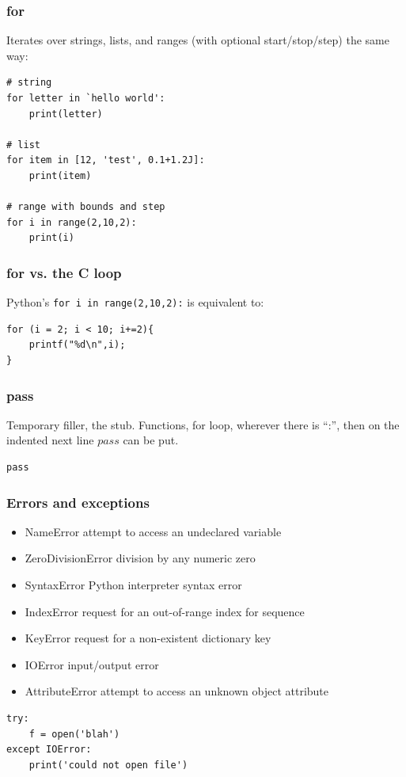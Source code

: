 \begin{frame}[fragile]\frametitle{for}
Iterates over strings, lists, and ranges (with optional start/stop/step) the same way:
  \begin{lstlisting}
# string
for letter in `hello world':
	print(letter)

# list
for item in [12, 'test', 0.1+1.2J]:
	print(item)

# range with bounds and step
for i in range(2,10,2):
	print(i)
  \end{lstlisting}
\end{frame}

\begin{frame}[fragile]\frametitle{for vs. the C loop}
Python's \lstinline{for i in range(2,10,2):} is equivalent to:
  \begin{lstlisting}
for (i = 2; i < 10; i+=2){
	printf("%d\n",i);
}
  \end{lstlisting}
\end{frame}

\begin{frame}[fragile]\frametitle{pass}
Temporary filler, the stub. Functions, for loop, wherever there is ``:'', then on the indented next line $pass$ can be put.
  \begin{lstlisting}
pass
  \end{lstlisting}
\end{frame}

\begin{frame}[fragile]\frametitle{Errors and exceptions}
  \begin{itemize}
  \item NameError attempt to access an undeclared variable
  \item ZeroDivisionError division by any numeric zero
  \item SyntaxError Python interpreter syntax error
  \item IndexError request for an out-of-range index for sequence
  \item KeyError request for a non-existent dictionary key
  \item IOError input/output error
  \item AttributeError attempt to access an unknown object attribute
  \end{itemize}
  \begin{lstlisting}
try:
	f = open('blah')
except IOError:
	print('could not open file')
  \end{lstlisting}
\end{frame}


